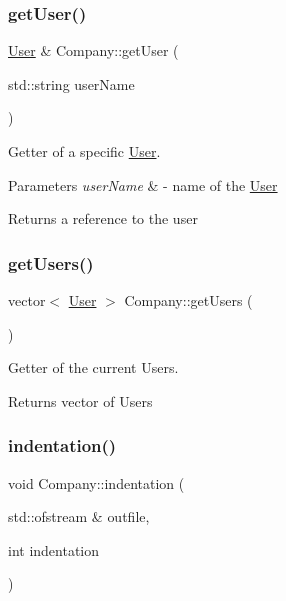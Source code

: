 \subsubsection{\texorpdfstring{get\+User()}{getUser()}}
{\footnotesize\ttfamily \mbox{\hyperlink{class_user}{User}} \& Company\+::get\+User (\begin{DoxyParamCaption}\item[{std\+::string}]{user\+Name }\end{DoxyParamCaption})}



Getter of a specific \mbox{\hyperlink{class_user}{User}}. 


\begin{DoxyParams}{Parameters}
{\em user\+Name} & -\/ name of the \mbox{\hyperlink{class_user}{User}} \\
\hline
\end{DoxyParams}
\begin{DoxyReturn}{Returns}
a reference to the user 
\end{DoxyReturn}
\mbox{\label{class_company_a6f6a3dbf24278f5e1395d123d5812f33}} 
\subsubsection{\texorpdfstring{get\+Users()}{getUsers()}}
{\footnotesize\ttfamily vector$<$ \mbox{\hyperlink{class_user}{User}} $>$ Company\+::get\+Users (\begin{DoxyParamCaption}{ }\end{DoxyParamCaption})}



Getter of the current Users. 

\begin{DoxyReturn}{Returns}
vector of Users 
\end{DoxyReturn}
\mbox{\label{class_company_aa8b5bbb3b2d49d13f36d4fcdfc0d20d1}} 
\subsubsection{\texorpdfstring{indentation()}{indentation()}}
{\footnotesize\ttfamily void Company\+::indentation (\begin{DoxyParamCaption}\item[{std\+::ofstream \&}]{outfile,  }\item[{int}]{indentation }\end{DoxyParamCaption})}



